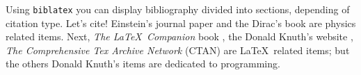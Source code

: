 Using \texttt{biblatex} you can display bibliography divided into sections, 
depending of citation type. 
Let's cite! Einstein's journal paper \cite{einstein} and the Dirac's 
book \cite{dirac} are physics related items. 
Next, \textit{The \LaTeX\ Companion} book \cite{latexcompanion}, the Donald 
Knuth's website \cite{knuthwebsite}, \textit{The Comprehensive Tex Archive 
Network} (CTAN) \cite{ctan} are \LaTeX\ related items; but the others Donald 
Knuth's items \cite{knuth-fa,knuth-acp} are dedicated to programming. 
